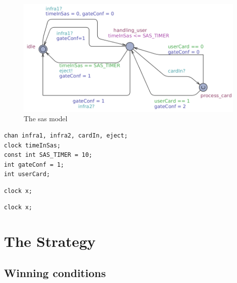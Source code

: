 \begin{figure}[!h]
	\centering
    \includegraphics[width=\textwidth]{sasModel.png}
    \caption{The sas model}
    \label{sasModel}
\end{figure}

\lstset{language=c++}
\lstset{commentstyle=\color{colComments}\textit,
basicstyle=\ttfamily\small, %
identifierstyle=\color{colIdentifier}, %
keywordstyle=\color{colKeys}, %
stringstyle=\color{colString}, %
commentstyle=\color{colComments}, %
columns=flexible, %
tabsize=2, %
extendedchars=true, %
showspaces=false, %
showstringspaces=false, %
numbers=left, %
numberstyle=\tiny, %
breaklines=true, %
breakautoindent=true, %
captionpos=b,%
}
\begin{lstlisting}[caption=Global declarations of the systems., label=globalDecl]
chan infra1, infra2, cardIn, eject;
clock timeInSas;
const int SAS_TIMER = 10;
int gateConf = 1;
int userCard;
\end{lstlisting}
\begin{lstlisting}[caption=Declarations of the user model., label=userDecl]
clock x;
\end{lstlisting}
\begin{lstlisting}[caption=Declarations of the sas model., label=sasDecl]
clock x;
\end{lstlisting}

\section{The Strategy}
\subsection{Winning conditions}

